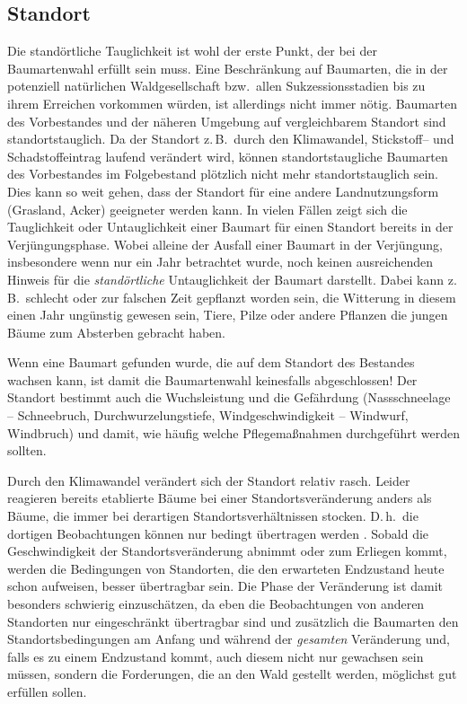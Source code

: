 \documentclass[twocolumn]{scrartcl}
\begin{document}
\subsection{Standort}
\label{ssec:standort}

Die standörtliche Tauglichkeit ist wohl der erste Punkt, der bei der
Baumartenwahl erfüllt sein muss. Eine Beschränkung auf Baumarten, die in der
potenziell natürlichen Waldgesellschaft bzw.\ allen Sukzessionsstadien bis zu
ihrem Erreichen vorkommen würden, ist allerdings nicht immer nötig. Baumarten
des Vorbestandes und der näheren Umgebung auf vergleichbarem Standort sind
standortstauglich. Da der Standort z.\,B.\ durch den Klimawandel, Stickstoff-- und
Schadstoffeintrag laufend verändert wird, können standortstaugliche Baumarten
des Vorbestandes im Folgebestand plötzlich nicht mehr standortstauglich sein.
Dies kann so weit gehen, dass der Standort für eine andere Landnutzungsform
(Grasland, Acker) geeigneter werden kann. In vielen Fällen zeigt sich die
Tauglichkeit oder Untauglichkeit einer Baumart für einen Standort bereits in der
Verjüngungsphase. Wobei alleine der Ausfall einer Baumart in der Verjüngung,
insbesondere wenn nur ein Jahr betrachtet wurde, noch keinen ausreichenden Hinweis
für die \emph{standörtliche} Untauglichkeit der Baumart darstellt. Dabei kann
z.\,B.\ schlecht oder zur falschen Zeit gepflanzt worden sein, die Witterung in
diesem einen Jahr ungünstig gewesen sein, Tiere, Pilze oder andere Pflanzen die
jungen Bäume zum Absterben gebracht haben.

Wenn eine Baumart gefunden wurde, die auf dem Standort des Bestandes
wachsen kann, ist damit die Baumartenwahl keinesfalls abgeschlossen!
Der Standort bestimmt auch die Wuchsleistung und die Gefährdung
(Nassschneelage -- Schneebruch, Durchwurzelungstiefe,
Windgeschwindigkeit -- Windwurf, Windbruch) und damit, wie häufig
welche Pflegemaßnahmen durchgeführt werden sollten.

Durch den Klimawandel verändert sich der Standort relativ
rasch. Leider reagieren bereits etablierte Bäume bei einer
Standortsveränderung anders als Bäume, die immer bei derartigen
Standortsverhältnissen stocken. D.\,h.\ die dortigen Beobachtungen können
nur bedingt übertragen werden \cite{yue2022SiteIndex}. Sobald die
Geschwindigkeit der Standortsveränderung abnimmt oder zum Erliegen
kommt, werden die Bedingungen von Standorten, die den erwarteten Endzustand
heute schon aufweisen, besser übertragbar sein. Die Phase der
Veränderung ist damit besonders schwierig einzuschätzen, da eben die
Beobachtungen von anderen Standorten nur eingeschränkt übertragbar
sind und zusätzlich die Baumarten den Standortsbedingungen am Anfang
und während der \emph{gesamten} Veränderung und, falls es zu einem
Endzustand kommt, auch diesem nicht nur gewachsen sein müssen, sondern
die Forderungen, die an den Wald gestellt werden, möglichst gut
erfüllen sollen.
\end{document}
